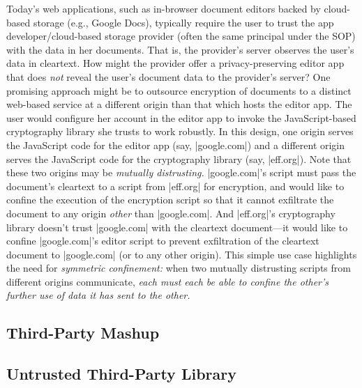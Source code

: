 Today's web applications, such as in-browser document editors backed
by cloud-based storage (e.g., Google Docs), typically require the user
to trust the app developer/cloud-based storage provider (often the
same principal under the SOP) with the data in her documents. That is,
the provider's server observes the user's data in cleartext. How might
the provider offer a privacy-preserving editor app that does {\em not}
reveal the user's document data to the provider's server?  One
promising approach might be to outsource encryption of documents to a
distinct web-based service at a different origin than that which hosts
the editor app. The user would configure her account in the editor app
to invoke the JavaScript-based cryptography library she trusts to work
robustly. In this design, one origin serves the JavaScript code for
the editor app (say, \js|google.com|) and a different origin serves
the JavaScript code for the cryptography library (say,
\js|eff.org|). Note that these two origins may be {\em mutually
  distrusting.}  \js|google.com|'s script must pass the document's
cleartext to a script from \js|eff.org| for encryption, and would like
to confine the execution of the encryption script so that it cannot
exfiltrate the document to any origin {\em other} than
\js|google.com|. And \js|eff.org|'s cryptography library doesn't trust
\js|google.com| with the cleartext document---it would like to confine
\js|google.com|'s editor script to prevent exfiltration of the
cleartext document to \js|google.com| (or to any other origin). This
simple use case highlights the need for {\em symmetric confinement:}
when two mutually distrusting scripts from different origins
communicate, {\em each must each be able to confine the other's
  further use of data it has sent to the other.}


\subsection{Third-Party Mashup}

\subsection{Untrusted Third-Party Library}
